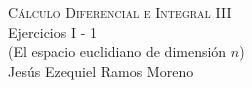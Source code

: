 \documentclass[12pt]{article}
\begin{document}
\pagestyle{empty}
\begin{center}
{\textsc{Cálculo Diferencial e Integral III} \\
\medskip 
\large{Ejercicios I - 1 \\
(El espacio euclidiano de dimensión $n$)}}\\
Jesús Ezequiel Ramos Moreno
\end{center}
\bigskip
\end{document}
